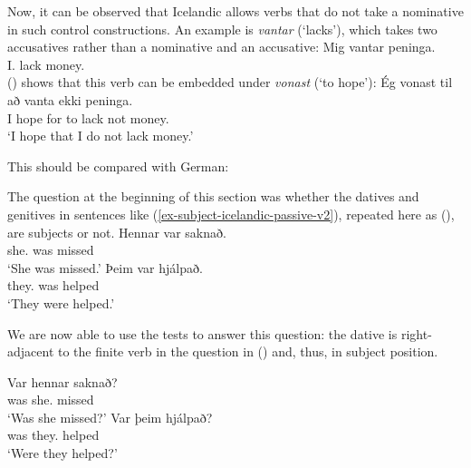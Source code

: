 Now, it can be observed that Icelandic allows verbs that do not take a nominative in such control
constructions. An example is \emph{vantar} (`lacks'), which takes two accusatives rather than a
nominative and an accusative:
\ea
\gll Mig      vantar peninga.\\
     I.\ACC{} lack   money.\ACC\\\icelandic
\z
() shows that this verb can be embedded under \emph{vonast} (`to hope'):
\ea
\gll Ég vonast til að vanta ekki peninga.\\
     I  hope   for to lack  not  money.\ACC\\\icelandic
\glt `I hope that I do not lack money.'
\z

This should be compared with German:
\eal
{}
\zl

\noindent
The question at the beginning of this section was whether the datives and genitives in sentences
like (\ref{ex-subject-icelandic-passive-v2}), repeated here as (), are subjects or not.
\eal
\ex 
\gll Hennar     var saknað.\\
     she.\GEN{} was missed\\\icelandic
\glt `She was missed.'
\ex 
\gll Þeim        var hjálpað.\\
     they.\DAT{} was helped\\
\glt `They were helped.'
\zl

\noindent
We are now able to use the tests to answer this question: the dative is right-adjacent to the finite
verb in the question in () and, thus, in subject position.

\eal
\ex 
\gll Var hennar saknað?\\
     was she.\GEN{} missed\\\icelandic
\glt `Was she missed?'
\ex
\gll Var þeim       hjálpað?\\
     was they.\DAT{} helped   \\
\glt `Were they helped?'
\zl



